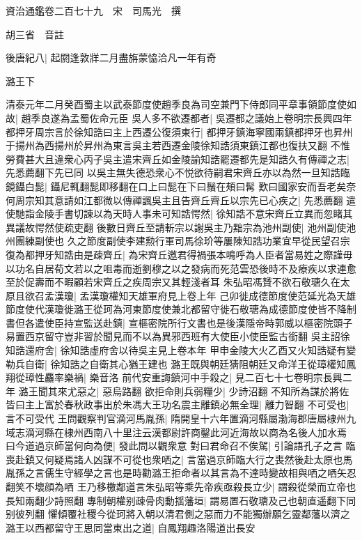資治通鑑卷二百七十九　宋　司馬光　撰

胡三省　音註

後唐紀八|{
	起閼逢敦牂二月盡旃蒙恊洽凡一年有奇}


潞王下

清泰元年二月癸酉蜀主以武泰節度使趙季良為司空兼門下侍郎同平章事領節度使如故|{
	趙季良遂為孟蜀佐命元臣}
吳人多不欲遷都者|{
	吳遷都之議始上卷明宗長興四年}
都押牙周宗言於徐知誥曰主上西遷公復須東行|{
	都押牙鎮海寧國兩鎮都押牙也昇州于揚州為西揚州於昇州為東言吳主若西遷金陵徐知誥須東鎮江都也復扶又翻}
不惟勞費甚大且違衆心丙子吳主遣宋齊丘如金陵諭知誥罷遷都先是知誥久有傳禪之志|{
	先悉薦翻下先已同}
以吳主無失德恐衆心不悦欲待嗣君宋齊丘亦以為然一旦知誥臨鏡鑷白髭|{
	鑷尼輒翻髭即移翻在口上曰髭在下曰鬚在頰曰髯}
歎曰國家安而吾老矣奈何周宗知其意請如江都微以傳禪諷吳主且告齊丘齊丘以宗先已心疾之|{
	先悉薦翻}
遣使馳詣金陵手書切諫以為天時人事未可知誥愕然|{
	徐知誥不意宋齊丘立異而忽睹其異議故愕然使疏吏翻}
後數日齊丘至請斬宗以謝吳主乃黜宗為池州副使|{
	池州副使池州團練副使也}
久之節度副使李建勲行軍司馬徐玠等屢陳知誥功業宜早從民望召宗復為都押牙知誥由是疎齊丘|{
	為宋齊丘邀君得禍張本鳴呼為人臣者當易姓之際謹毋以功名自居荀文若以之咀毒而逝劉穆之以之發病而死范雲恐後時不及療疾以求連愈至於促壽而不暇顧若宋齊丘之疾周宗又其輕淺者耳}
朱弘昭馮贇不欲石敬瑭久在太原且欲召孟漢瓊|{
	孟漢瓊權知天雄軍府見上卷上年}
己卯徙成德節度使范延光為天雄節度使代漢瓊徙潞王從珂為河東節度使兼北都留守徙石敬瑭為成德節度使皆不降制書但各遣使臣持宣監送赴鎮|{
	宣樞密院所行文書也是後漢隱帝時郭威以樞密院頭子易置西京留守豈非習於聞見而不以為異邪西班有大使臣小使臣監古銜翻}
吳主詔徐知誥還府舍|{
	徐知誥虛府舍以待吳主見上卷本年}
甲申金陵大火乙酉又火知誥疑有變勒兵自衛|{
	徐知誥之自衛其心猶王建也}
潞王既與朝廷猜阻朝廷又命洋王從璋權知鳳翔從璋性麤率樂禍|{
	樂音洛}
前代安重誨鎮河中手殺之|{
	見二百七十七卷明宗長興二年}
潞王聞其來尤惡之|{
	惡烏路翻}
欲拒命則兵弱糧少|{
	少詩沼翻}
不知所為謀於將佐皆曰主上富於春秋政事出於朱馮大王功名震主離鎮必無全理|{
	離力智翻}
不可受也|{
	言不可受代}
王問觀察判官滴河馬胤孫|{
	隋開皇十六年置滴河縣屬渤海郡唐屬棣州九域志滴河縣在棣州西南八十里注云漢都尉許商鑿此河近海故以商為名後人加水焉}
曰今道過京師當何向為便|{
	發此問以觀衆意}
對曰君命召不俟駕|{
	引論語孔子之言}
臨喪赴鎮又何疑焉諸人凶謀不可從也衆哂之|{
	言當過京師臨大行之喪然後赴太原也馬胤孫之言儒生守經學之言也是時勸潞王拒命者以其言為不達時變故相與哂之哂矢忍翻笑不壞顔為哂}
王乃移檄鄰道言朱弘昭等乘先帝疾亟殺長立少|{
	謂殺從榮而立帝也長知兩翻少詩照翻}
專制朝權别疎骨肉動揺藩垣|{
	謂易置石敬瑭及己也朝直遥翻下同别彼列翻}
懼傾覆社稷今從珂將入朝以清君側之惡而力不能獨辦願乞靈鄰藩以濟之潞王以西都留守王思同當東出之道|{
	自鳳翔趣洛陽道出長安}
